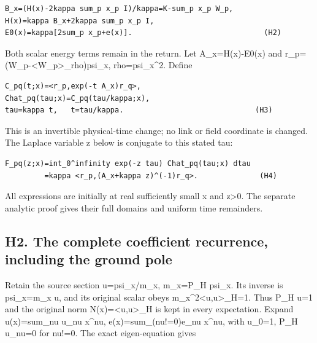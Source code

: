 \documentclass[11pt,a4paper]{article}
\renewcommand{\[}{\begingroup\small\originaldisplaystart}
\renewcommand{\]}{\originaldisplayend\endgroup}
\begin{document}
\begin{verbatim}
B_x=(H(x)-2kappa sum_p x_p I)/kappa=K-sum_p x_p W_p,
H(x)=kappa B_x+2kappa sum_p x_p I,
E0(x)=kappa[2sum_p x_p+e(x)].                              (H2)
\end{verbatim}

Both scalar energy terms remain in the return. Let A\_x=H(x)-E0(x) and
{r\allowbreak{}\_\allowbreak{}p\allowbreak{}=\allowbreak{}(\allowbreak{}W\allowbreak{}\_\allowbreak{}p\allowbreak{}-\allowbreak{}\textless{}\allowbreak{}W\allowbreak{}\_\allowbreak{}p\allowbreak{}\textgreater{}\allowbreak{}\_\allowbreak{}r\allowbreak{}h\allowbreak{}o\allowbreak{})\allowbreak{}p\allowbreak{}s\allowbreak{}i\allowbreak{}\_\allowbreak{}x\allowbreak{},\allowbreak{}}
rho=psi\_x\^{}2. Define

\begin{verbatim}
C_pq(t;x)=<r_p,exp(-t A_x)r_q>,
Chat_pq(tau;x)=C_pq(tau/kappa;x),
tau=kappa t,   t=tau/kappa.                              (H3)
\end{verbatim}

This is an invertible physical-time change; no link or field coordinate
is changed. The Laplace variable z below is conjugate to this stated
tau:

\begin{verbatim}
F_pq(z;x)=int_0^infinity exp(-z tau) Chat_pq(tau;x) dtau
         =kappa <r_p,(A_x+kappa z)^(-1)r_q>.              (H4)
\end{verbatim}

All expressions are initially at real sufficiently small x and
z\textgreater0. The separate analytic proof gives their full domains and
uniform time remainders.

\subsection{H2. The complete coefficient recurrence, including the
ground
pole}\label{h2.-the-complete-coefficient-recurrence-including-the-ground-pole}

Retain the source section u=psi\_x/m\_x, m\_x=P\_H psi\_x. Its inverse
is psi\_x=m\_x u, and its original scalar obeys
m\_x\^{}2\textless u,u\textgreater\_H=1. Thus P\_H u=1 and the original
norm N(x)=\textless u,u\textgreater\_H is kept in every expectation.
Expand u(x)=sum\_nu u\_nu x\^{}nu,
{e\allowbreak{}(\allowbreak{}x\allowbreak{})\allowbreak{}=\allowbreak{}s\allowbreak{}u\allowbreak{}m\allowbreak{}\_\allowbreak{}(\allowbreak{}n\allowbreak{}u\allowbreak{}!\allowbreak{}=\allowbreak{}0\allowbreak{})\allowbreak{}e\allowbreak{}\_\allowbreak{}n\allowbreak{}u\allowbreak{}}
x\^{}nu, with u\_0=1, P\_H u\_nu=0 for nu!=0. The exact eigen-equation
gives
\end{document}
